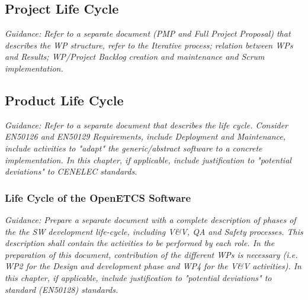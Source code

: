\documentclass{template/openetcs_article}
\begin{document}

\subsection{Project Life Cycle }



\textit{Guidance: Refer to a separate document (PMP and Full Project Proposal)  that describes the WP structure, refer to  the Iterative process; relation between WPs and Results; WP/Project Backlog creation and maintenance and Scrum implementation.}


\subsection{Product Life Cycle }


\textit{Guidance: Refer to a separate document that describes the life cycle. Consider EN50126 and EN50129 Requirements, include Deployment and Maintenance, include activities to "adapt" the generic/abstract software to a concrete implementation.
In this chapter, if applicable, include justification to "potential deviations" to CENELEC standards.}

\subsubsection{Life Cycle of the OpenETCS Software}
\textit{Guidance: Prepare a separate document with a complete description of phases of the the SW development life-cycle, including V\&V, QA and Safety processes. This description shall contain the activities to be performed by each role.
In the preparation of this document, contribution of the different WPs is necessary (i.e. WP2 for the Design and development phase and WP4 for the V\&V activities).
In this chapter, if applicable, include justification to "potential deviations" to standard (EN50128) standards.}
\end{document}
